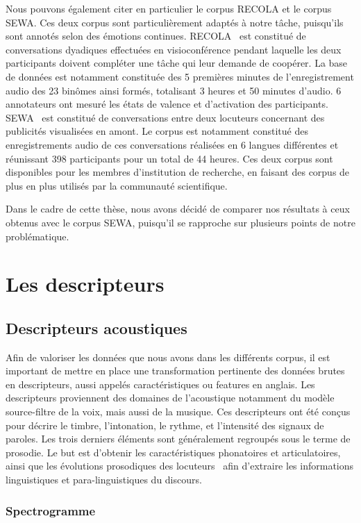 Nous pouvons également citer en particulier le corpus RECOLA et le corpus SEWA. Ces deux corpus sont particulièrement adaptés à notre tâche, puisqu'ils sont annotés selon des émotions continues.
RECOLA~\cite{Ringeval2013} est constitué de conversations dyadiques effectuées en visioconférence pendant laquelle les deux participants doivent compléter une tâche qui leur demande de coopérer. La base de données est notamment constituée des 5 premières minutes de l'enregistrement audio des 23 binômes ainsi formés, totalisant 3 heures et 50 minutes d'audio. 6 annotateurs ont mesuré les états de valence et d'activation des participants.
SEWA~\cite{SEWA} est constitué de conversations entre deux locuteurs concernant des publicités visualisées en amont. Le corpus est notamment constitué des enregistrements audio de ces conversations réalisées en 6 langues différentes et réunissant 398 participants pour un total de 44 heures. Ces deux corpus sont disponibles pour les membres d'institution de recherche, en faisant des corpus de plus en plus utilisés par la communauté scientifique.

Dans le cadre de cette thèse, nous avons décidé de comparer nos résultats à ceux obtenus avec le corpus SEWA, puisqu'il se rapproche sur plusieurs points de notre problématique.

\section{Les descripteurs}
\subsection{Descripteurs acoustiques}
\label{sec:3.3.1}
Afin de valoriser les données que nous avons dans les différents corpus, il est important de mettre en place une transformation pertinente des données brutes en descripteurs, aussi appelés caractéristiques ou features en anglais. Les descripteurs proviennent des domaines de l'acoustique notamment du modèle source-filtre de la voix, mais aussi de la musique. Ces descripteurs ont été conçus pour décrire le timbre, l'intonation, le rythme, et l'intensité des signaux de paroles. Les trois derniers éléments sont généralement regroupés sous le terme de prosodie. Le but est d'obtenir les caractéristiques phonatoires et articulatoires, ainsi que les évolutions prosodiques des locuteurs~\cite{Scherer1986} afin d'extraire les informations linguistiques et para-linguistiques du discours.

\subsubsection{Spectrogramme}
%

